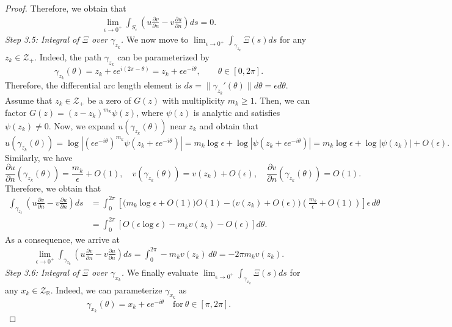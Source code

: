 \documentclass[11pt,twoside]{article} %
\begin{document}
\begin{proof}
Therefore, we obtain that
\begin{align}
\lim_{\epsilon \to 0^+} \int_{S_{\epsilon}} \left( u \frac{\partial v}{\partial n} - v \frac{\partial u}{\partial n} \right) ds = 0. \label{eq:logarithmic_bound_4}
\end{align}
\emph{Step 3.5: Integral of $\Xi$ over $\gamma_{z_k}$. } We now move to $\lim_{\epsilon \to 0^+} \int_{\gamma_{z_k}} \Xi(s) ds$ for any $z_k \in \mathcal{Z}_{+}$. Indeed, the path $\gamma_{z_k}$ can be parameterized by
$$\gamma_{z_k}(\theta) = z_k + \epsilon e^{i(2\pi - \theta)} = z_k + \epsilon e^{-i\theta}, \qquad \theta \in [0, 2\pi].$$
Therefore, the differential arc length element is $ds = \|\gamma_{z_k}'(\theta)\|d\theta = \epsilon d\theta$. Assume that $z_k \in \mathcal{Z}_+$ be a zero of $G(z)$ with multiplicity $m_k \ge 1$. Then, we can factor $G(z) = (z - z_k)^{m_k} \psi(z)$, where $\psi(z)$ is analytic and satisfies $\psi(z_k) \neq 0$. Now, we expand $u(\gamma_{z_k}(\theta))$ near $z_{k}$ and obtain that
$$u(\gamma_{z_k}(\theta)) = \log|(\epsilon e^{-i\theta})^{m_k} \psi(z_k + \epsilon e^{-i\theta})| = m_k \log\epsilon + \log|\psi(z_k + \epsilon e^{-i\theta})| = m_k \log\epsilon + \log|\psi(z_k)| + O(\epsilon).$$
Similarly, we have
$$\frac{\partial u}{\partial n}(\gamma_{z_{k}}(\theta)) = \frac{m_k}{\epsilon} + O(1), \quad v(\gamma_{z_k}(\theta)) = v(z_k) + O(\epsilon), \quad \frac{\partial v}{\partial n}(\gamma_{z_{k}}(\theta)) = O(1).$$
Therefore, we obtain that
\begin{align*}
\int_{\gamma_{z_k}} \left( u \frac{\partial v}{\partial n} - v \frac{\partial u}{\partial n} \right) ds & = \int_0^{2\pi} \left[ \Big(m_k\log\epsilon + O(1)\Big)O(1) - \Big(v(z_k) + O(\epsilon)\Big)\left(\frac{m_k}{\epsilon} + O(1)\right) \right] \epsilon \, d\theta \\
& = \int_0^{2\pi} \left[ O(\epsilon \log\epsilon) - m_k v(z_k) - O(\epsilon) \right] d\theta. \label{eq:logarithmic_bound_5}
\end{align*}
As a consequence, we arrive at
\begin{align}
\lim_{\epsilon \to 0^+} \int_{\gamma_{z_k}} \left( u \frac{\partial v}{\partial n} - v \frac{\partial u}{\partial n} \right) ds = \int_0^{2\pi} -m_k v(z_k) \, d\theta = -2\pi m_k v(z_k). 
\end{align}
\emph{Step 3.6: Integral of $\Xi$ over $\gamma_{x_k}$.} We finally evaluate $\lim_{\epsilon \to 0^+} \int_{\gamma_{x_k}} \Xi(s) ds$ for any $x_k \in \mathcal{Z}_{\mathbb{R}}$. Indeed, we can parameterize $\gamma_{x_{k}}$ as 
$$\gamma_{x_k}(\theta) = x_k + \epsilon e^{-i\theta} \quad \text{for} \ \theta \in [\pi, 2\pi].$$ 

\end{proof}
\end{document}
